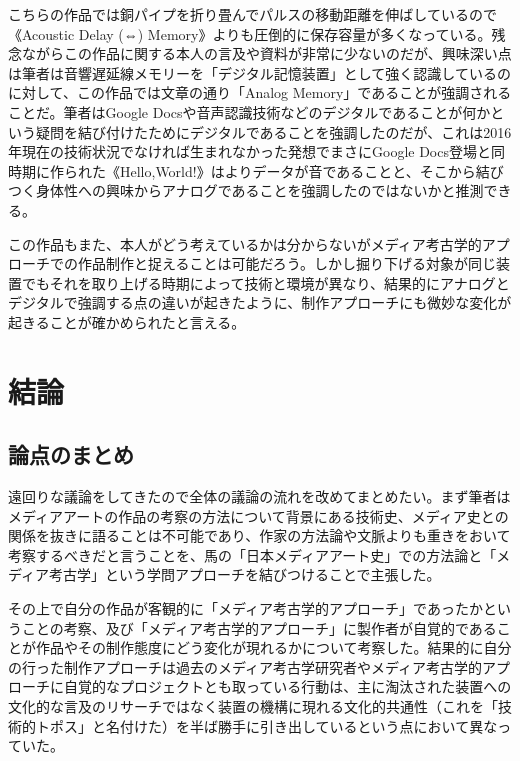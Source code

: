 \documentclass[a4paper,report]{jsbook}
\begin{document}
こちらの作品では銅パイプを折り畳んでパルスの移動距離を伸ばしているので《Acoustic
Delay (⇔)
Memory》よりも圧倒的に保存容量が多くなっている。残念ながらこの作品に関する本人の言及や資料が非常に少ないのだが、興味深い点は筆者は音響遅延線メモリーを「デジタル記憶装置」として強く認識しているのに対して、この作品では文章の通り「Analog
Memory」であることが強調されることだ。筆者はGoogle
Docsや音声認識技術などのデジタルであることが何かという疑問を結び付けたためにデジタルであることを強調したのだが、これは2016年現在の技術状況でなければ生まれなかった発想でまさにGoogle
Docs登場と同時期に作られた《Hello,World!》はよりデータが音であることと、そこから結びつく身体性への興味からアナログであることを強調したのではないかと推測できる。\autocites{yunchul:hello}{yunchul:interview}

この作品もまた、本人がどう考えているかは分からないがメディア考古学的アプローチでの作品制作と捉えることは可能だろう。しかし掘り下げる対象が同じ装置でもそれを取り上げる時期によって技術と環境が異なり、結果的にアナログとデジタルで強調する点の違いが起きたように、制作アプローチにも微妙な変化が起きることが確かめられたと言える。

\chapter{結論}\label{ux7d50ux8ad6}

\section{論点のまとめ}\label{ux8ad6ux70b9ux306eux307eux3068ux3081}

遠回りな議論をしてきたので全体の議論の流れを改めてまとめたい。まず筆者はメディアアートの作品の考察の方法について背景にある技術史、メディア史との関係を抜きに語ることは不可能であり、作家の方法論や文脈よりも重きをおいて考察するべきだと言うことを、馬の「日本メディアアート史」での方法論と「メディア考古学」という学問アプローチを結びつけることで主張した。

その上で自分の作品が客観的に「メディア考古学的アプローチ」であったかということの考察、及び「メディア考古学的アプローチ」に製作者が自覚的であることが作品やその制作態度にどう変化が現れるかについて考察した。結果的に自分の行った制作アプローチは過去のメディア考古学研究者やメディア考古学的アプローチに自覚的なプロジェクトとも取っている行動は、主に淘汰された装置への文化的な言及のリサーチではなく装置の機構に現れる文化的共通性（これを「技術的トポス」と名付けた）を半ば勝手に引き出しているという点において異なっていた。
\end{document}
